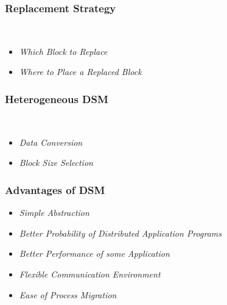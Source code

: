\documentclass{beamer}
\begin{document}
\begin{frame}
	\frametitle{Replacement Strategy}
	\\
	\vspace{0.5cm}	
	\begin{itemize}
		\item \textit{Which Block to Replace}
		\item \textit{Where to Place a Replaced Block}
	\end{itemize}
	\vspace{2cm}
\end{frame}


\begin{frame}
	\frametitle{Heterogeneous DSM}
	\\
	\vspace{0.5cm}	
	\begin{itemize}
		\item \textit{Data Conversion}
		\item \textit{Block Size Selection}
	\end{itemize}
	\vspace{2cm}
\end{frame}


\begin{frame}
	\frametitle{Advantages of DSM}
	\vspace{0.5cm}	
	\begin{itemize}
		\item \textit{Simple Abstraction}
		\item \textit{Better Probability of Distributed Application Programs}
		\item \textit{Better Performance of some Application}
		\item \textit{Flexible Communication Environment}
		\item \textit{Ease of Process Migration}
	\end{itemize}
	\vspace{4cm}
\end{frame}
\end{document}
